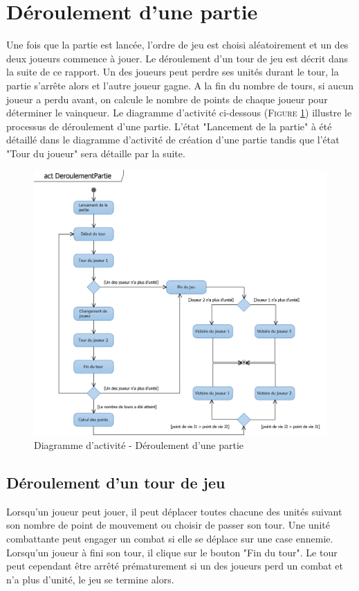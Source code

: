 \documentclass[a4paper,11pt]{article}
\begin{document}
\section{Déroulement d'une partie}
	\vspace*{0.5cm}
	Une fois que la partie est lancée, l'ordre de jeu est choisi aléatoirement et un des deux joueurs commence à jouer. Le déroulement d'un tour de jeu est décrit dans la suite de ce rapport. Un des joueurs peut perdre ses unités durant le tour, la partie s'arrête alors et l'autre joueur gagne. A la fin du nombre de tours, si aucun joueur a perdu avant, on calcule le nombre de points de chaque joueur pour déterminer le vainqueur. Le diagramme d'activité ci-dessous (\textsc{Figure \ref{fig:actpartie}}) illustre le processus de déroulement d'une partie. L'état "Lancement de la partie" à été détaillé dans le diagramme d'activité de création d'une partie tandis que l'état "Tour du joueur" sera détaille par la suite.

	\vspace*{1cm}
	\begin{figure}[ht!]
		\includegraphics{actDeroulementPartie.png}
		\caption{Diagramme d'activité - Déroulement d'une partie}
		\label{fig:actpartie}
	\end{figure}
	\vspace*{1cm}
	\newpage

	\subsection{Déroulement d'un tour de jeu}
		\vspace*{0.5cm}
		Lorsqu'un joueur peut jouer, il peut déplacer toutes chacune des unités suivant son nombre de point de mouvement ou choisir de passer son tour. Une unité combattante peut engager un combat si elle se déplace sur une case ennemie. Lorsqu'un joueur à fini son tour, il clique sur le bouton "Fin du tour". Le tour peut cependant être arrêté prématurement si un des joueurs perd un combat et n'a plus d'unité, le jeu se termine alors.
		\vspace*{0.5cm}
\end{document}

